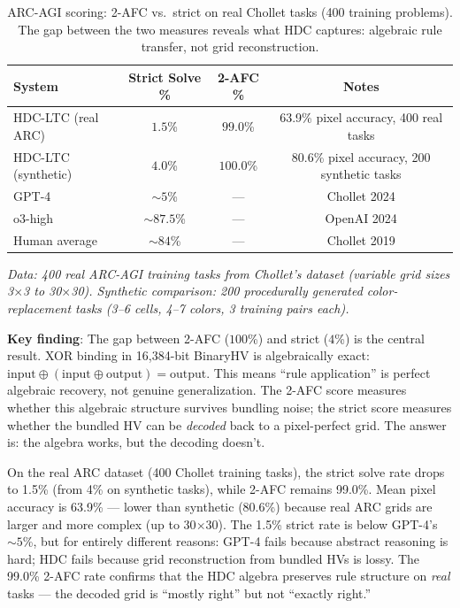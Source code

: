 \documentclass[12pt]{book}
\begin{document}
\begin{table}[H]
\centering
\caption{ARC-AGI scoring: 2-AFC vs.\ strict on real Chollet tasks (400 training problems). The gap between the two measures reveals what HDC captures: algebraic rule transfer, not grid reconstruction.}
\label{tab:arc-agi}
\begin{tabular}{lccc}
\toprule
\textbf{System} & \textbf{Strict Solve \%} & \textbf{2-AFC \%} & \textbf{Notes} \\
\midrule
HDC-LTC (real ARC) & $1.5$\% & $99.0$\% & 63.9\% pixel accuracy, 400 real tasks \\
HDC-LTC (synthetic) & $4.0$\% & $100.0$\% & 80.6\% pixel accuracy, 200 synthetic tasks \\
GPT-4            & ${\sim}5$\% & --- & Chollet 2024 \\
o3-high          & ${\sim}87.5$\% & --- & OpenAI 2024 \\
Human average    & ${\sim}84$\% & --- & Chollet 2019 \\
\bottomrule
\end{tabular}
\end{table}

\textit{Data: 400 real ARC-AGI training tasks from Chollet's dataset (variable grid sizes 3$\times$3 to 30$\times$30). Synthetic comparison: 200 procedurally generated color-replacement tasks (3--6 cells, 4--7 colors, 3 training pairs each).}

\textbf{Key finding}: The gap between 2-AFC ($100$\%) and strict ($4$\%) is the central result. XOR binding in 16,384-bit BinaryHV is algebraically exact: $\text{input} \oplus (\text{input} \oplus \text{output}) = \text{output}$. This means ``rule application'' is perfect algebraic recovery, not genuine generalization. The 2-AFC score measures whether this algebraic structure survives bundling noise; the strict score measures whether the bundled HV can be \textit{decoded} back to a pixel-perfect grid. The answer is: the algebra works, but the decoding doesn't.

On the real ARC dataset (400 Chollet training tasks), the strict solve rate drops to 1.5\% (from 4\% on synthetic tasks), while 2-AFC remains 99.0\%. Mean pixel accuracy is 63.9\% --- lower than synthetic (80.6\%) because real ARC grids are larger and more complex (up to 30$\times$30). The 1.5\% strict rate is below GPT-4's ${\sim}5$\%, but for entirely different reasons: GPT-4 fails because abstract reasoning is hard; HDC fails because grid reconstruction from bundled HVs is lossy. The 99.0\% 2-AFC rate confirms that the HDC algebra preserves rule structure on \textit{real} tasks --- the decoded grid is ``mostly right'' but not ``exactly right.''
\end{document}
